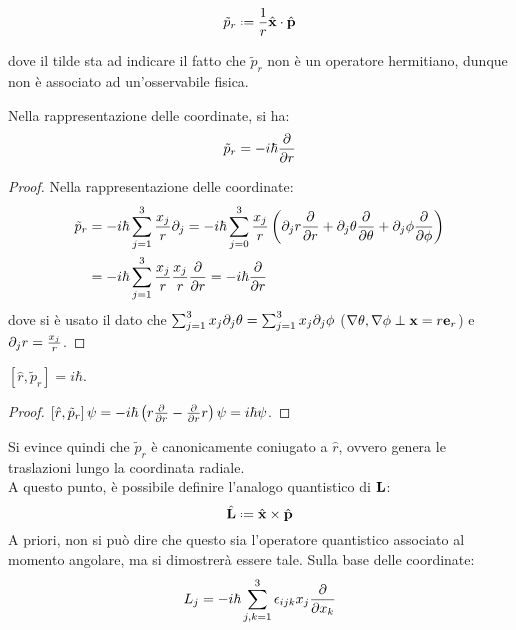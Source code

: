 \begin{equation}
	\tilde{p}_r \defeq \frac{1}{r} \hat{\ve{x}}\cdot\hat{\ve{p}}
	\label{eq:29}
\end{equation}

dove il tilde sta ad indicare il fatto che $ \tilde{p}_r $ non è un operatore hermitiano, dunque non è associato ad un'osservabile fisica.

\begin{proposition}
	Nella rappresentazione delle coordinate, si ha:
	\begin{equation}
		\tilde{p}_r = - i \hbar \frac{\partial}{\partial r}
		\label{eq:30}
	\end{equation}
\end{proposition}
\begin{proof}
	Nella rappresentazione delle coordinate:
	\begin{equation*}
		\begin{split}
			\tilde{p}_r &= -i\hbar \sum_{j = 1}^{3} \frac{x_j}{r} \partial_j = -i\hbar \sum_{j = 0}^{3} \frac{x_j}{r} \left(\partial_j r \frac{\partial}{\partial r} + \partial_j \theta \frac{\partial}{\partial \theta} + \partial_j \phi \frac{\partial}{\partial \phi}\right)\\
				    &= -i\hbar \sum_{j = 1}^{3} \frac{x_j}{r} \frac{x_j}{r} \frac{\partial}{\partial r} = -i\hbar \frac{\partial}{\partial r}
		\end{split}
	\end{equation*}
	dove si è usato il dato che $ \sum_{j = 1}^{3} x_j \partial_j \theta = \sum_{j = 1}^{3} x_j \partial_j \phi $ ($ \nabla\theta, \nabla\phi \perp \mathbf{x} = r\mathbf{e}_r $) e $ \partial_j r = \frac{x_j}{r} $.
\end{proof}

\begin{proposition}
	$ \left[\hat{r}, \tilde{p}_r\right] = i\hbar $.
\end{proposition}
\begin{proof}
	$ \left[\hat{r}, \tilde{p}_r\right]\psi = -i\hbar \left(r \frac{\partial}{\partial r} - \frac{\partial}{\partial r}r\right)\psi = i\hbar\psi $.
\end{proof}

Si evince quindi che $ \tilde{p}_r $ è canonicamente coniugato a $ \hat{r} $, ovvero genera le traslazioni lungo la coordinata radiale.\\
A questo punto, è possibile definire l'analogo quantistico di $ \mathbf{L} $:
\begin{equation}
	\hat{\ve{L}} \defeq \hat{\ve{x}}\times\hat{\ve{p}}
	\label{eq:1.31}
\end{equation}
A priori, non si può dire che questo sia l'operatore quantistico associato al momento angolare, ma si dimostrerà essere tale. Sulla base delle coordinate:
\begin{equation}
	L_j = -i\hbar \sum_{j,k = 1}^{3} \epsilon_{ijk} x_j \frac{\partial}{\partial x_k}
	\label{eq:1.32}
\end{equation}

